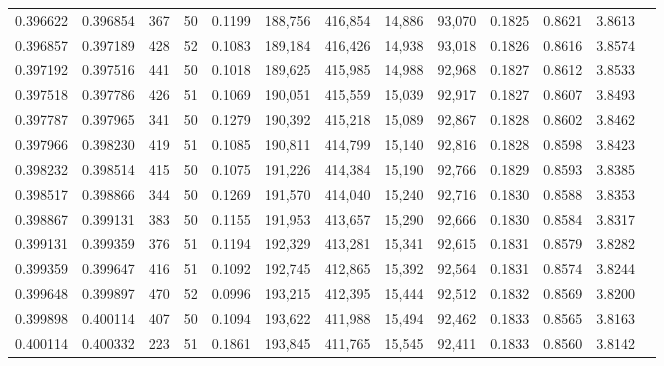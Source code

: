 \begin{tabular}{rrrrrrrrrrrrr}
0.396622 & 0.396854 &   367 &  50 &                                     0.1199 & 188,756 & 416,854 &  14,886 &  93,070 & 0.1825 & 0.8621 & 3.8613 \\
0.396857 & 0.397189 &   428 &  52 &                                     0.1083 & 189,184 & 416,426 &  14,938 &  93,018 & 0.1826 & 0.8616 & 3.8574 \\
0.397192 & 0.397516 &   441 &  50 &                                     0.1018 & 189,625 & 415,985 &  14,988 &  92,968 & 0.1827 & 0.8612 & 3.8533 \\
0.397518 & 0.397786 &   426 &  51 &                                     0.1069 & 190,051 & 415,559 &  15,039 &  92,917 & 0.1827 & 0.8607 & 3.8493 \\
0.397787 & 0.397965 &   341 &  50 &                                     0.1279 & 190,392 & 415,218 &  15,089 &  92,867 & 0.1828 & 0.8602 & 3.8462 \\
0.397966 & 0.398230 &   419 &  51 &                                     0.1085 & 190,811 & 414,799 &  15,140 &  92,816 & 0.1828 & 0.8598 & 3.8423 \\
0.398232 & 0.398514 &   415 &  50 &                                     0.1075 & 191,226 & 414,384 &  15,190 &  92,766 & 0.1829 & 0.8593 & 3.8385 \\
0.398517 & 0.398866 &   344 &  50 &                                     0.1269 & 191,570 & 414,040 &  15,240 &  92,716 & 0.1830 & 0.8588 & 3.8353 \\
0.398867 & 0.399131 &   383 &  50 &                                     0.1155 & 191,953 & 413,657 &  15,290 &  92,666 & 0.1830 & 0.8584 & 3.8317 \\
0.399131 & 0.399359 &   376 &  51 &                                     0.1194 & 192,329 & 413,281 &  15,341 &  92,615 & 0.1831 & 0.8579 & 3.8282 \\
0.399359 & 0.399647 &   416 &  51 &                                     0.1092 & 192,745 & 412,865 &  15,392 &  92,564 & 0.1831 & 0.8574 & 3.8244 \\
0.399648 & 0.399897 &   470 &  52 &                                     0.0996 & 193,215 & 412,395 &  15,444 &  92,512 & 0.1832 & 0.8569 & 3.8200 \\
0.399898 & 0.400114 &   407 &  50 &                                     0.1094 & 193,622 & 411,988 &  15,494 &  92,462 & 0.1833 & 0.8565 & 3.8163 \\
0.400114 & 0.400332 &   223 &  51 &                                     0.1861 & 193,845 & 411,765 &  15,545 &  92,411 & 0.1833 & 0.8560 & 3.8142 \\

\end{tabular}
